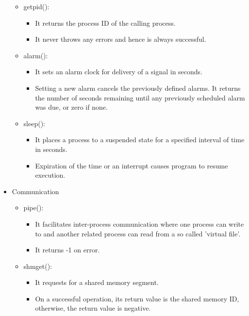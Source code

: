 \begin{itemize}
\begin{itemize}
            \item getpid():
                \begin{itemize}
                    \item It returns the process ID of the calling process.
                    \item It never throws any errors and hence is always successful.
                \end{itemize}
            \item alarm():
                \begin{itemize}
                    \item It sets an alarm clock for delivery of a signal in seconds.
                    \item Setting a new alarm cancels the previously defined alarms. It returns the number of seconds remaining until any previously scheduled alarm was due, or zero if none.
                \end{itemize}
            \item sleep():
                \begin{itemize}
                    \item It places a process to a suspended state for a specified interval of time in seconds.
                    \item Expiration of the time or an interrupt causes program to resume execution.
                \end{itemize}
        \end{itemize}
    \item Communication
        \begin{itemize}
            \item pipe():
                \begin{itemize}
                    \item It facilitates inter-process communication where one process can write to and another related process can read from a so called ’virtual file’.
                    \item It returns -1 on error.
                \end{itemize}
            \item shmget():
                \begin{itemize}
                    \item It requests for a shared memory segment.
                    \item On a successful operation, its return value is the shared memory ID, otherwise, the return value is negative.
                \end{itemize}
        \end{itemize}
\end{itemize}

